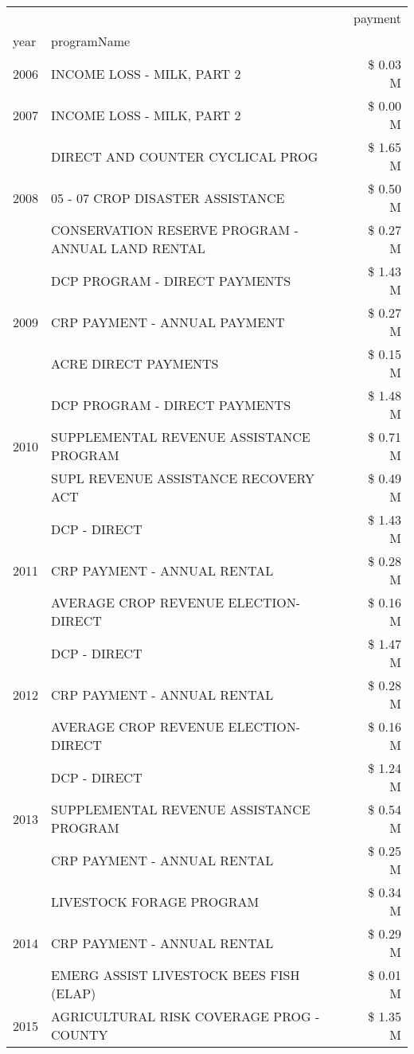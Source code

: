 \begin{tabular}{llr}
\toprule
 &  & payment \\
year & programName &  \\
\midrule
2006 & INCOME LOSS - MILK, PART 2 & \$ 0.03 M \\
\cline{1-3}
2007 & INCOME LOSS - MILK, PART 2 & \$ 0.00 M \\
\cline{1-3}
\multirow[t]{3}{*}{2008} & DIRECT AND COUNTER CYCLICAL PROG & \$ 1.65 M \\
 & 05 - 07 CROP DISASTER ASSISTANCE & \$ 0.50 M \\
 & CONSERVATION RESERVE PROGRAM - ANNUAL LAND RENTAL & \$ 0.27 M \\
\cline{1-3}
\multirow[t]{3}{*}{2009} & DCP PROGRAM - DIRECT PAYMENTS & \$ 1.43 M \\
 & CRP PAYMENT - ANNUAL PAYMENT & \$ 0.27 M \\
 & ACRE DIRECT PAYMENTS & \$ 0.15 M \\
\cline{1-3}
\multirow[t]{3}{*}{2010} & DCP PROGRAM - DIRECT PAYMENTS & \$ 1.48 M \\
 & SUPPLEMENTAL REVENUE ASSISTANCE PROGRAM & \$ 0.71 M \\
 & SUPL REVENUE ASSISTANCE RECOVERY ACT & \$ 0.49 M \\
\cline{1-3}
\multirow[t]{3}{*}{2011} & DCP - DIRECT & \$ 1.43 M \\
 & CRP PAYMENT - ANNUAL RENTAL & \$ 0.28 M \\
 & AVERAGE CROP REVENUE ELECTION-DIRECT & \$ 0.16 M \\
\cline{1-3}
\multirow[t]{3}{*}{2012} & DCP - DIRECT & \$ 1.47 M \\
 & CRP PAYMENT - ANNUAL RENTAL & \$ 0.28 M \\
 & AVERAGE CROP REVENUE ELECTION-DIRECT & \$ 0.16 M \\
\cline{1-3}
\multirow[t]{3}{*}{2013} & DCP - DIRECT & \$ 1.24 M \\
 & SUPPLEMENTAL REVENUE ASSISTANCE PROGRAM & \$ 0.54 M \\
 & CRP PAYMENT - ANNUAL RENTAL & \$ 0.25 M \\
\cline{1-3}
\multirow[t]{3}{*}{2014} & LIVESTOCK FORAGE PROGRAM & \$ 0.34 M \\
 & CRP PAYMENT - ANNUAL RENTAL & \$ 0.29 M \\
 & EMERG ASSIST LIVESTOCK BEES FISH (ELAP) & \$ 0.01 M \\
\cline{1-3}
\multirow[t]{3}{*}{2015} & AGRICULTURAL RISK COVERAGE PROG - COUNTY & \$ 1.35 M \\

\end{tabular}

